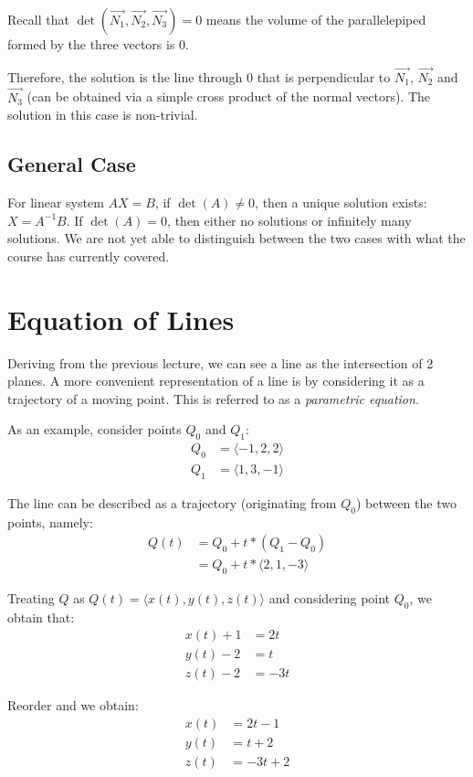 \documentclass[12pt]{article}
\newcommand{\iv}[1]{\langle #1 \rangle}
\theoremstyle{definition}
\begin{document}
	Recall that $\det(\vec{N_1}, \vec{N_2}, \vec{N_3}) = 0$ means the volume of the parallelepiped formed by the three vectors is $0$.
	
	Therefore, the solution is the line through $0$ that is perpendicular to $\vec{N_1}$, $\vec{N_2}$ and $\vec{N_3}$ (can be obtained via a simple cross product of the normal vectors). The solution in this case is non-trivial.
	
	\subsection{General Case}
	
	For linear system $AX = B$, if $\det(A) \neq 0$, then a unique solution exists: $X = A^{-1}B$. If $\det(A) = 0$, then either no solutions or infinitely many solutions. We are not yet able to distinguish between the two cases with what the course has currently covered.
	
	
	\section{Equation of Lines}
	
	Deriving from the previous lecture, we can see a line as the intersection of 2 planes. A more convenient representation of a line is by considering it as a trajectory of a moving point. This is referred to as a \emph{parametric equation}.
	
	As an example, consider points $Q_0$ and $Q_1$:
	\begin{align*}
		Q_0 &= \iv{-1, 2, 2} \\
		Q_1 &= \iv{1, 3, -1}
	\end{align*}
	
	The line can be described as a trajectory (originating from $Q_0$) between the two points, namely:
	\begin{align*}
		Q(t) &= Q_0 + t * (Q_1 - Q_0) \\
		&= Q_0 + t * \iv{2, 1, -3}
	\end{align*}
	
	Treating $Q$ as $Q(t) = \iv{x(t), y(t), z(t)}$ and considering point $Q_0$, we obtain that:
	\begin{align*}
		x(t) + 1 &= 2t \\
		y(t) - 2 &= t \\
		z(t ) - 2 &= -3t
	\end{align*}
	
	Reorder and we obtain:
	\begin{align*}
		x(t) &= 2t - 1 \\
		y(t) &= t + 2\\
		z(t ) &= -3t + 2
	\end{align*}
	
\end{document}
